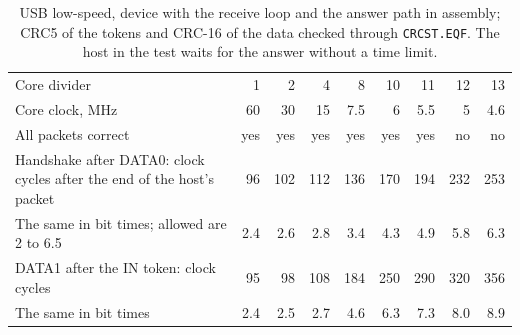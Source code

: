 \documentclass[10pt,a4paper]{article}
\newcommand{\reg}[1]{\texttt{#1}}
\begin{document}
\begin{table}[H]
\centering\small
\begin{tabularx}{\linewidth}{@{}Lrrrrrrrr@{}}
\toprule
Core divider & 1 & 2 & 4 & 8 & 10 & 11 & 12 & 13 \\
Core clock, MHz & 60 & 30 & 15 & 7.5 & 6 & 5.5 & 5 & 4.6 \\
\midrule
All packets correct & yes & yes & yes & yes & yes & yes & no & no \\
Handshake after DATA0: clock cycles after the end of the host's packet & 96 & 102 & 112 & 136 & 170 & 194 & 232 & 253 \\
The same in bit times; allowed are 2 to 6.5 & 2.4 & 2.6 & 2.8 & 3.4 & 4.3 & 4.9 & 5.8 & 6.3 \\
DATA1 after the IN token: clock cycles & 95 & 98 & 108 & 184 & 250 & 290 & 320 & 356 \\
The same in bit times & 2.4 & 2.5 & 2.7 & 4.6 & 6.3 & 7.3 & 8.0 & 8.9 \\
\bottomrule
\end{tabularx}
\caption{USB low-speed, device with the receive loop and the answer path in assembly; CRC5 of the tokens and CRC-16 of the data checked through \reg{CRCST.EQF}. The host in the test waits for the answer without a time limit.}
\end{table}
\end{document}
